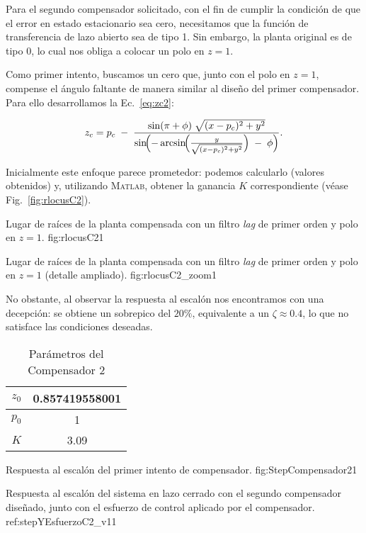 Para el segundo compensador solicitado, con el fin de cumplir la condición de que el error en estado estacionario sea cero, necesitamos que la función de transferencia de lazo abierto sea de tipo 1. Sin embargo, la planta original es de tipo 0, lo cual nos obliga a colocar un polo en $z=1$.

Como primer intento, buscamos un cero que, junto con el polo en $z=1$, compense el ángulo faltante de manera similar al diseño del primer compensador. Para ello desarrollamos la Ec.~\eqref{eq:zc2}:

\begin{equation}
	\label{eq:zc2}
	z_c
	= p_c \;-\;
	\frac{
		\sin(\pi + \phi)\;
		\sqrt{(x - p_c)^2 + y^2}
	}{
		\sin\!\Bigl(
		-\arcsin\!\Bigl(\frac{y}{\sqrt{(x - p_c)^2 + y^2}}\Bigr)\;-\;\phi
		\Bigr)
	}.
\end{equation}

Inicialmente este enfoque parece prometedor: podemos calcularlo (valores obtenidos) y, utilizando \textsc{Matlab}, obtener la ganancia $K$ correspondiente (véase Fig.~\ref{fig:rlocusC2}).

{Lugar de raíces de la planta compensada con un filtro \emph{lag} de primer orden y polo en $z=1$.}
{fig:rlocusC2}{1}

{Lugar de raíces de la planta compensada con un filtro \emph{lag} de primer orden y polo en $z=1$ (detalle ampliado).}
{fig:rlocusC2_zoom}{1}

No obstante, al observar la respuesta al escalón nos encontramos con una decepción: se obtiene un sobrepico del $20\%$, equivalente a un $\zeta \approx 0.4$, lo que no satisface las condiciones deseadas.

\begin{table}[H]
	\centering
	\caption{Parámetros del Compensador 2}
	\begin{tabular}{|c|c|}
		\hline
		$z_0$ & 0.857419558001 \\ \hline
		$p_0$ & 1 \\ \hline
		$K$   & 3.09 \\ \hline
	\end{tabular}
\end{table}


{Respuesta al escalón del primer intento de compensador.}
{fig:StepCompensador2}{1}

{Respuesta al escal\'on del sistema en lazo cerrado con el segundo compensador dise\~nado, junto con el esfuerzo de control aplicado por el compensador.}
{ref:stepYEsfuerzoC2_v1}{1}

